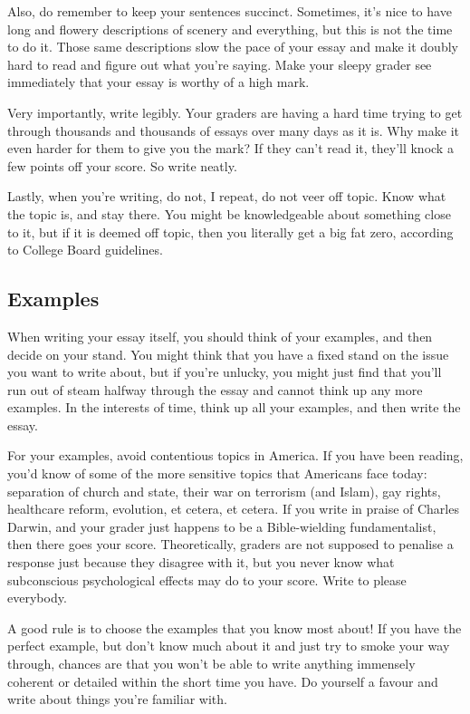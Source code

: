 \documentclass[DIV=calc,11pt,parskip,numbers=noenddot]{scrartcl} %
\begin{document}
Also, do remember to keep your sentences succinct. Sometimes, it’s nice to have long and flowery descriptions of scenery and everything, but this is not the time to do it. Those same descriptions slow the pace of your essay and make it doubly hard to read and figure out what you’re saying. Make your sleepy grader see immediately that your essay is worthy of a high mark.

Very importantly, write legibly. Your graders are having a hard time trying to get through thousands and thousands of essays over many days as it is. Why make it even harder for them to give you the mark? If they can’t read it, they’ll knock a few points off your score. So write neatly.

Lastly, when you’re writing, do not, I repeat, do not veer off topic. Know what the topic is, and stay there. You might be knowledgeable about something close to it, but if it is deemed off topic, then you literally get a big fat zero, according to College Board guidelines.
\subsection{Examples}
When writing your essay itself, you should think of your examples, and then decide on your stand. You might think that you have a fixed stand on the issue you want to write about, but if you’re unlucky, you might just find that you’ll run out of steam halfway through the essay and cannot think up any more examples. In the interests of time, think up all your examples, and then write the essay.

For your examples, avoid contentious topics in America. If you have been reading, you’d know of some of the more sensitive topics that Americans face today: separation of church and state, their war on terrorism (and Islam), gay rights, healthcare reform, evolution, et cetera, et cetera. If you write in praise of Charles Darwin, and your grader just happens to be a Bible-wielding fundamentalist, then there goes your score. Theoretically, graders are not supposed to penalise a response just because they disagree with it, but you never know what subconscious psychological effects may do to your score. Write to please everybody.

A good rule is to choose the examples that you know most about! If you have the perfect example, but don’t know much about it and just try to smoke your way through, chances are that you won’t be able to write anything immensely coherent or detailed within the short time you have. Do yourself a favour and write about things you’re familiar with.
\end{document}
